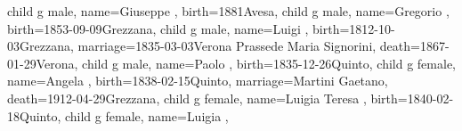 \documentclass{article}
\begin{document}
\begin{midpage}
\begin{center}
\begin{genealogypicture}
{{{{{{{{{                                    child{
                                        g{
                                            male,
                                            name={Giuseppe },
                                            birth={1881}{Avesa},
                                        }
                                    }
                                }
                                child{
                                    g{
                                        male,
                                        name={Gregorio },
                                        birth={1853-09-09}{Grezzana},
                                    }
                                }
                            }
                            child{
                                g{
                                    male,
                                    name={Luigi },
                                    birth={1812-10-03}{Grezzana},
                                    marriage={1835-03-03}{Verona \newline Prassede Maria Signorini},
                                    death={1867-01-29}{Verona},
                                }
                                child{
                                    g{
                                        male,
                                        name={Paolo },
                                        birth={1835-12-26}{Quinto},
                                    }
                                }
                                child{
                                    g{
                                        female,
                                        name={Angela },
                                        birth={1838-02-15}{Quinto},
                                        marriage={Martini Gaetano}{},
                                        death={1912-04-29}{Grezzana},
                                    }
                                }
                                child{
                                    g{
                                        female,
                                        name={Luigia Teresa },
                                        birth={1840-02-18}{Quinto},
                                    }
                                }
                                child{
                                    g{
                                        female,
                                        name={Luigia },
}}}}}}}}}}
\end{genealogypicture}
\end{center}
\end{midpage}
\end{document}
